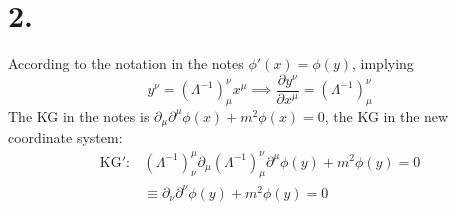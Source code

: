 \documentclass{article}
\begin{document}
\section*{2.}
According to the notation in the notes $\phi'(x) = \phi(y)$, implying
\begin{equation}
    y^\nu = (\Lambda^{-1})_\mu^\nu x^\mu \implies \frac{\partial y^\nu}{\partial x^\mu} = (\Lambda^{-1})_\mu^\nu
\end{equation}
The KG in the notes is $\partial_\mu \partial^\mu \phi(x) + m^2 \phi(x) = 0$, the KG in the new 
coordinate system:
\begin{equation}
    \begin{split}
       \text{KG}': &(\Lambda^{-1})^\mu_\nu \partial_\mu (\Lambda^{-1})_\mu^\nu \partial^\mu \phi(y) + m^2 \phi(y) = 0\\
        & \equiv \partial_\nu \partial^\nu \phi(y) + m^2\phi(y) = 0  
    \end{split}
\end{equation}
\end{document}
